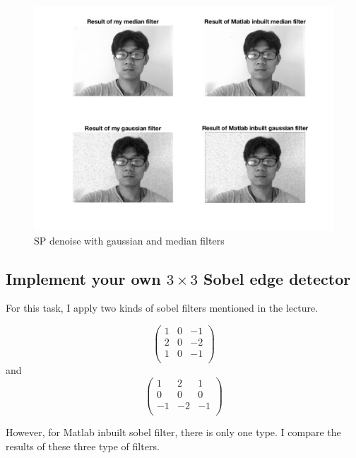 \documentclass{article}
\begin{document}
\begin{figure}[htbp]
    \centering
    \includegraphics[scale = 0.25]{fig14.jpg}
    \caption{SP denoise with gaussian and median filters}
    \label{fig14}
\end{figure}

\subsection{Implement your own $3\times3$ Sobel edge detector}

For this task, I apply two kinds of sobel filters mentioned in the lecture. 

\begin{equation}
    \left(
    \begin{array}{ccc}
        1 & 0 & -1 \\
        2 & 0 & -2 \\
        1 & 0 & -1 \\
    \end{array}
    \right)
\end{equation}
and 
\begin{equation}
    \left(
    \begin{array}{ccc}
        1 & 2 & 1 \\
        0 & 0 & 0 \\
        -1 & -2 & -1 \\
    \end{array}
    \right)
\end{equation}

However, for Matlab inbuilt sobel filter, there is only one type. I compare the results of these three type of filters.
\end{document}
